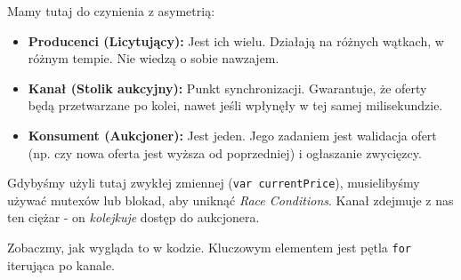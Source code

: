 Mamy tutaj do czynienia z asymetrią:
\begin{itemize}
    \item \textbf{Producenci (Licytujący):} Jest ich wielu. Działają na różnych wątkach, w różnym tempie. Nie wiedzą o sobie nawzajem.
    \item \textbf{Kanał (Stolik aukcyjny):} Punkt synchronizacji. Gwarantuje, że oferty będą przetwarzane po kolei, nawet jeśli wpłynęły w tej samej milisekundzie.
    \item \textbf{Konsument (Aukcjoner):} Jest jeden. Jego zadaniem jest walidacja ofert (np. czy nowa oferta jest wyższa od poprzedniej) i ogłaszanie zwycięzcy.
\end{itemize}

Gdybyśmy użyli tutaj zwykłej zmiennej (\texttt{var currentPrice}), musielibyśmy używać mutexów lub blokad, aby uniknąć \textit{Race Conditions}. Kanał zdejmuje z nas ten ciężar - on \textit{kolejkuje} dostęp do aukcjonera.

Zobaczmy, jak wygląda to w kodzie. Kluczowym elementem jest pętla \texttt{for} iterująca po kanale.

